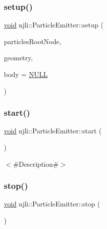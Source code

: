 \subsubsection{\texorpdfstring{setup()}{setup()}}
{\footnotesize\ttfamily \mbox{\hyperlink{_thread_8h_af1e856da2e658414cb2456cb6f7ebc66}{void}} njli\+::\+Particle\+Emitter\+::setup (\begin{DoxyParamCaption}\item[{\mbox{\hyperlink{classnjli_1_1_node}{Node}} $\ast$}]{particles\+Root\+Node,  }\item[{\mbox{\hyperlink{classnjli_1_1_geometry}{Geometry}} $\ast$}]{geometry,  }\item[{\mbox{\hyperlink{classnjli_1_1_physics_body}{Physics\+Body}} $\ast$}]{body = {\ttfamily \mbox{\hyperlink{_util_8h_a070d2ce7b6bb7e5c05602aa8c308d0c4}{N\+U\+LL}}} }\end{DoxyParamCaption})}

\mbox{\label{classnjli_1_1_particle_emitter_aed77fee123512b6c75b019defbdcaacd}} 
\subsubsection{\texorpdfstring{start()}{start()}}
{\footnotesize\ttfamily \mbox{\hyperlink{_thread_8h_af1e856da2e658414cb2456cb6f7ebc66}{void}} njli\+::\+Particle\+Emitter\+::start (\begin{DoxyParamCaption}{ }\end{DoxyParamCaption})}

$<$\#\+Description\#$>$ \mbox{\label{classnjli_1_1_particle_emitter_a45a3c77c2299042082d3dfd0d69a8bb1}} 
\subsubsection{\texorpdfstring{stop()}{stop()}}
{\footnotesize\ttfamily \mbox{\hyperlink{_thread_8h_af1e856da2e658414cb2456cb6f7ebc66}{void}} njli\+::\+Particle\+Emitter\+::stop (\begin{DoxyParamCaption}{ }\end{DoxyParamCaption})}


